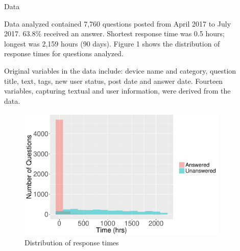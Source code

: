 \documentclass[final]{beamer}
\newlength{\sepwid}
\newlength{\onecolwid}
\newlength{\twocolwid}
\begin{document}
\begin{frame}[t]
\begin{columns}[t]
\begin{column}{\onecolwid}
\begin{block}{Data}

Data analyzed contained 7,760 questions posted from April 2017 to July 2017. 63.8\% received an answer. Shortest response time was 0.5 hours; longest was 2,159 hours (90 days). Figure 1 shows the distribution of response times for questions analyzed. 

Original variables in the data include: device name and category, question title, text, tags, new user status, post date and answer date. Fourteen variables, capturing textual and user information, were derived from the data.

\end{block}


\begin{figure}
\includegraphics[width=1\linewidth]{FIG1.pdf}
\caption{Distribution of response times}
\label{fig1}
\end{figure}


\end{column} %

\begin{column}{\sepwid}\end{column} %

\begin{column}{\twocolwid} %

\begin{columns}[t,totalwidth=\twocolwid] %


\end{columns}
\end{column}
\end{columns}
\end{frame}
\end{document}

